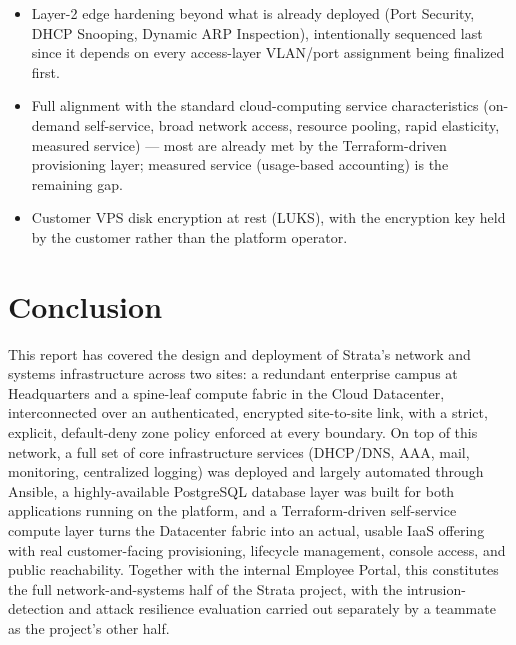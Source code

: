\documentclass[11pt,a4paper]{report}
\begin{document}
\begin{itemize}[leftmargin=1.5em]
  \item Layer-2 edge hardening beyond what is already deployed
    (Port Security, DHCP Snooping, Dynamic ARP Inspection), intentionally
    sequenced last since it depends on every access-layer VLAN/port
    assignment being finalized first.
  \item Full alignment with the standard cloud-computing service
    characteristics (on-demand self-service, broad network access,
    resource pooling, rapid elasticity, measured service) --- most are
    already met by the Terraform-driven provisioning layer; measured
    service (usage-based accounting) is the remaining gap.
  \item Customer VPS disk encryption at rest (LUKS), with the encryption
    key held by the customer rather than the platform operator.
\end{itemize}

\chapter{Conclusion}

This report has covered the design and deployment of Strata's network and
systems infrastructure across two sites: a redundant enterprise campus at
Headquarters and a spine-leaf compute fabric in the Cloud Datacenter,
interconnected over an authenticated, encrypted site-to-site link, with a
strict, explicit, default-deny zone policy enforced at every boundary. On
top of this network, a full set of core infrastructure services (DHCP/DNS,
AAA, mail, monitoring, centralized logging) was deployed and largely
automated through Ansible, a highly-available PostgreSQL database layer was
built for both applications running on the platform, and a Terraform-driven
self-service compute layer turns the Datacenter fabric into an actual,
usable IaaS offering with real customer-facing provisioning, lifecycle
management, console access, and public reachability. Together with the
internal Employee Portal, this constitutes the full network-and-systems
half of the Strata project, with the intrusion-detection and attack
resilience evaluation carried out separately by a teammate as the
project's other half.
\end{document}

